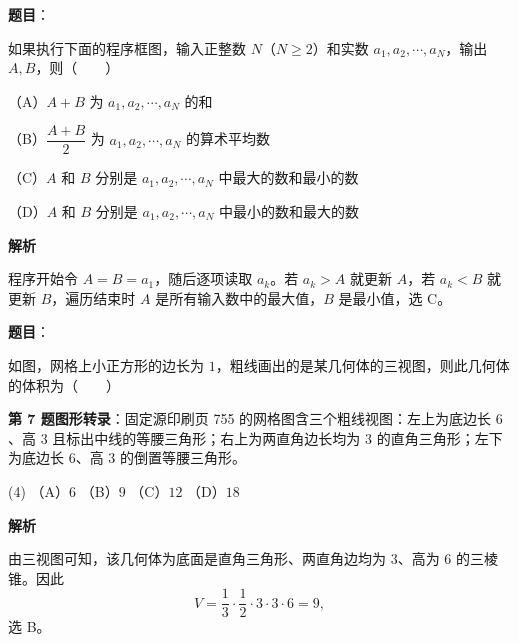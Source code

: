 \begin{answer}

\textbf{题目}：

如果执行下面的程序框图，输入正整数 $N$（$N\geqslant2$）和实数 $a_1,a_2,\cdots,a_N$，输出 $A,B$，则\mbox{（　　）}
\nopagebreak[4]
\begin{center}\end{center}
\nopagebreak[4]
（A）$A+B$ 为 $a_1,a_2,\cdots,a_N$ 的和

（B）$\dfrac{A+B}{2}$ 为 $a_1,a_2,\cdots,a_N$ 的算术平均数

（C）$A$ 和 $B$ 分别是 $a_1,a_2,\cdots,a_N$ 中最大的数和最小的数

（D）$A$ 和 $B$ 分别是 $a_1,a_2,\cdots,a_N$ 中最小的数和最大的数

\textbf{解析}

程序开始令 $A=B=a_1$，随后逐项读取 $a_k$。若 $a_k>A$ 就更新 $A$，若 $a_k<B$ 就更新 $B$，遍历结束时 $A$ 是所有输入数中的最大值，$B$ 是最小值，选 C。


\end{answer}
\begin{answer}

\textbf{题目}：

如图，网格上小正方形的边长为 $1$，粗线画出的是某几何体的三视图，则此几何体的体积为\mbox{（　　）}
\nopagebreak[4]
\begin{center}\end{center}
\nopagebreak[4]
\begin{gktip}
\textbf{第 7 题图形转录}：固定源印刷页 755 的网格图含三个粗线视图：左上为底边长 $6$、高 $3$ 且标出中线的等腰三角形；右上为两直角边长均为 $3$ 的直角三角形；左下为底边长 $6$、高 $3$ 的倒置等腰三角形。
\end{gktip}

\begin{gkopts}(4)
\task （A）$6$
\task （B）$9$
\task （C）$12$
\task （D）$18$
\end{gkopts}

\textbf{解析}

由三视图可知，该几何体为底面是直角三角形、两直角边均为 $3$、高为 $6$ 的三棱锥。因此
\nopagebreak[4]
\[
V=\frac13\cdot\frac12\cdot3\cdot3\cdot6=9,
\]
选 B。


\end{answer}
